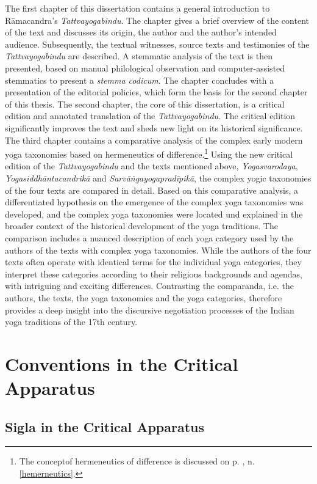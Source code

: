The first chapter of this dissertation contains a general introduction to Rāmacandra's \textit{Tattvayogabindu}. The chapter gives a brief overview of the content of the text and discusses its origin, the author and the author's intended audience. Subsequently, the textual witnesses, source texts and testimonies of the \textit{Tattvayogabindu} are described. A stemmatic analysis of the text is then presented, based on manual philological observation and computer-assisted stemmatics to present a \textit{stemma codicum}. The chapter concludes with a presentation of the editorial policies, which form the basis for the second chapter of this thesis.
The second chapter, the core of this dissertation, is a critical edition and annotated translation of the \textit{Tattvayogabindu}. The critical edition significantly improves the text and sheds new light on its historical significance.
The third chapter contains a comparative analysis of the complex early modern yoga taxonomies based on hermeneutics of difference.\footnote{The conceptof hermeneutics of difference is discussed on p. \pageref{hermeneutics}, n. \ref{hemerneutics}.}  Using the new critical edition of the \textit{Tattvayogabindu} and the texts mentioned above, \emph{Yogasvarodaya}, \emph{Yogasiddhāntacandrikā} and \emph{Sarvāṅgayogapradīpikā}, the complex yogic taxonomies of the four texts are compared in detail. Based on this comparative analysis, a differentiated hypothesis on the emergence of the complex yoga taxonomies was developed, and the complex yoga taxonomies were located und explained in the broader context of the historical development of the yoga traditions. The comparison includes a nuanced description of each yoga category used by the authors of the texts with complex yoga taxonomies. While the authors of the four texts often operate with identical terms for the individual yoga categories, they interpret these categories according to their religious backgrounds and agendas, with intriguing and exciting differences. Contrasting the comparanda, i.e. the authors, the texts, the yoga taxonomies and the yoga categories, therefore provides a deep insight into the discursive negotiation processes of the Indian yoga traditions of the 17th century.


\chapter{Conventions in the Critical Apparatus}
\section{Sigla in the Critical Apparatus}

